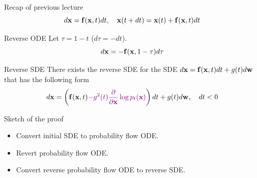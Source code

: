 \begin{frame}{Recap of previous lecture}
	\vspace{-0.3cm}
	\[
		d\mathbf{x} = \mathbf{f}(\mathbf{x}, t) dt, \quad \mathbf{x}(t + dt) = \mathbf{x}(t) + \mathbf{f}(\mathbf{x}, t) dt
	\]
	\vspace{-0.5cm}
	\begin{block}{Reverse ODE}
		Let $\tau = 1 - t$ ($d\tau = -dt$).
		\vspace{-0.3cm}
		\[
			d\mathbf{x} = - \mathbf{f}(\mathbf{x}, 1 - \tau) d \tau
		\]
	\end{block}
	\vspace{-0.5cm}
	\begin{block}{Reverse SDE}
		There exists the reverse SDE for the SDE $d\mathbf{x} = \mathbf{f}(\mathbf{x}, t) dt + g(t) d \mathbf{w}$ that has the following form
		\vspace{-0.3cm}
		\[
			d\mathbf{x} = \left(\mathbf{f}(\mathbf{x}, t) {\color{violet}- g^2(t) \frac{\partial}{\partial \mathbf{x}}\log p_t(\mathbf{x})}\right) dt + g(t) d \mathbf{w}, \quad dt < 0
		\] 
	\end{block}
	\vspace{-0.5cm}
	\begin{block}{Sketch of the proof}
		\begin{itemize}
			\item Convert initial SDE to probability flow ODE.
			\item Revert probability flow ODE.
			\item Convert reverse probability flow ODE to reverse SDE.
		\end{itemize}
	\end{block}
\end{frame}
